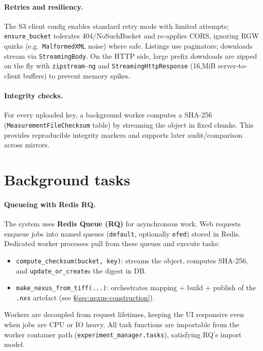 \paragraph{Retries and resiliency.}
The S3 client config enables standard retry mode with limited attempts; \texttt{ensure\_bucket} tolerates 404/NoSuchBucket and re-applies CORS, ignoring RGW quirks (e.g.\ \texttt{MalformedXML} noise) where safe. Listings use paginators; downloads stream via \texttt{StreamingBody}. On the HTTP side, large prefix downloads are zipped on the fly with \texttt{zipstream-ng} and \texttt{StreamingHttpResponse} (16,MiB server-to-client buffers) to prevent memory spikes.

\paragraph{Integrity checks.}
For every uploaded key, a background worker computes a SHA-256 (\texttt{MeasurementFileChecksum} table) by streaming the object in fixed chunks. This provides reproducible integrity markers and supports later audit/comparison across mirrors.

\section{Background tasks}\label{sec:background-tasks}

\paragraph{Queueing with Redis RQ.}
The system uses \textbf{Redis Queue (RQ)} for asynchronous work. Web requests enqueue jobs into named queues (\texttt{default}, optionally \texttt{ofed}) stored in Redis. Dedicated worker processes pull from these queues and execute tasks:

\begin{itemize}
	\item \texttt{compute\_checksum(bucket, key)}: streams the object, computes SHA-256, and \texttt{update\_or\_create}s the digest in DB.
	\item \texttt{make\_nexus\_from\_tiff(...)}: orchestrates mapping + build + publish of the \texttt{.nxs} artefact (see \S\ref{sec:nexus-construction}).
\end{itemize}

Workers are decoupled from request lifetimes, keeping the UI responsive even when jobs are CPU or IO heavy. All task functions are importable from the worker container path (\texttt{experiment\_manager.tasks}), satisfying RQ’s import model.

